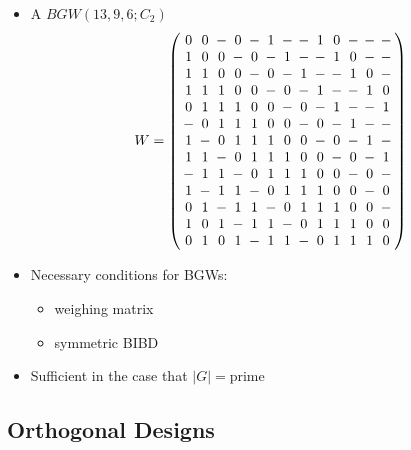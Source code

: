 \documentclass{beamer}
\newcommand{\abs}[1]{|#1|}
\begin{document}
\begin{frame}

  \begin{itemize}
  \item A $BGW(13,9,6;C_2)$
    \[
      W =
      \arraycolsep=2.0pt\def\arraystretch{1.0}
      \left(
        \begin{array}{ccccccccccccc}
          0&0&-&0&-&1&-&-&1&0&-&-&-\\
          1&0&0&-&0&-&1&-&-&1&0&-&-\\
          1&1&0&0&-&0&-&1&-&-&1&0&-\\
          1&1&1&0&0&-&0&-&1&-&-&1&0\\
          0&1&1&1&0&0&-&0&-&1&-&-&1\\
          -&0&1&1&1&0&0&-&0&-&1&-&-\\
          1&-&0&1&1&1&0&0&-&0&-&1&-\\
          1&1&-&0&1&1&1&0&0&-&0&-&1\\
          -&1&1&-&0&1&1&1&0&0&-&0&-\\
          1&-&1&1&-&0&1&1&1&0&0&-&0\\
          0&1&-&1&1&-&0&1&1&1&0&0&-\\
          1&0&1&-&1&1&-&0&1&1&1&0&0\\
          0&1&0&1&-&1&1&-&0&1&1&1&0\\
        \end{array}
      \right)
    \]
  \end{itemize}
  
\end{frame}

\begin{frame}

  \begin{itemize}
  \item Necessary conditions for BGWs:
    \begin{itemize}
    \item weighing matrix
    \item symmetric BIBD
    \end{itemize}
  \item Sufficient in the case that $\abs{G} = \text{prime}$ \cite[][]{lam-leung}
  \end{itemize}

\end{frame}


\subsection{Orthogonal Designs}
\end{document}
